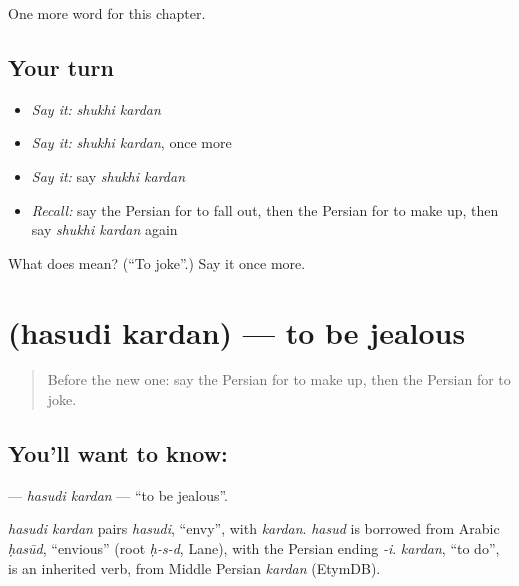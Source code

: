 \begin{grammarlens}[title={What you've built}]
One more word for this chapter.
\end{grammarlens}

\subsection*{Your turn}
\begin{itemize}
\raggedright
  \item \emph{Say it:} \emph{shukhi kardan}
  \item \emph{Say it:} \emph{shukhi kardan}, once more
  \item \emph{Say it:} say \emph{shukhi kardan}
  \item \emph{Recall:} say the Persian for to fall out, then the Persian for to make up, then say \emph{shukhi kardan} again
\end{itemize}

\begin{tcolorbox}[breakable,colback=teal!4,colframe=teal!35!black,title={Before you move on}]
What does   mean? (\textquotedblleft{}To joke\textquotedblright{}.) Say it once more.
\end{tcolorbox}
\section[\texorpdfstring{\fa{حسودی} \fa{کردن} (hasudi kardan)}{حسودی کردن (hasudi kardan)}]{  (hasudi kardan) — to be jealous}

\label{lesson:FA-C221-hasudi-kardan}



\begin{quote}
Before the new one: say the Persian for to make up, then the Persian for to joke.
\end{quote}

\subsection*{You'll want to know:  }
\textbf{ } — \emph{hasudi kardan} — \textquotedblleft{}to be jealous\textquotedblright{}.

\begin{cousinweb}
\emph{hasudi kardan} pairs \emph{hasudi}, \textquotedblleft{}envy\textquotedblright{}, with \emph{kardan}. \emph{hasud} is borrowed from Arabic \emph{ḥasūd}, \textquotedblleft{}envious\textquotedblright{} (root \emph{ḥ-s-d}, Lane), with the Persian ending \emph{-i}. \emph{kardan}, \textquotedblleft{}to do\textquotedblright{}, is an inherited verb, from Middle Persian \emph{kardan} (EtymDB).
\end{cousinweb}

